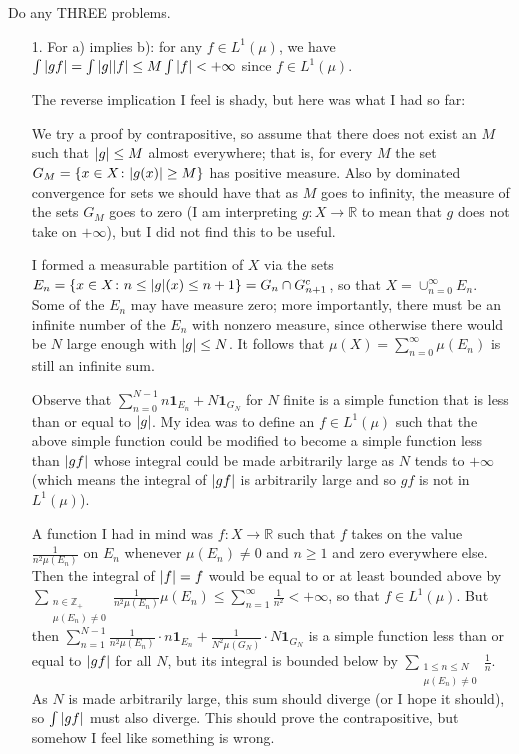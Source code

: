 \documentclass[11pt]{article}
\newcommand{\cbr}[1]{\left\{#1\right\}}
\begin{document}
Do any THREE problems.
\begin{enumerate}
  \item[1.] For a) implies b): for any $f\in L^1(\mu)$, we have $\int\abs{gf} = \int\abs{g}\abs{f}\leq M\int\abs{f}<+\infty$ since $f\in L^1(\mu)$.
  
  The reverse implication I feel is shady, but here was what I had so far: 

  We try a proof by contrapositive, so assume that there does not exist an $M$ such that $\abs{g}\leq M$ almost everywhere; that is, for every $M$ the set $G_M = \cbr{x\in X\colon \abs{g(x)}\geq M}$ has positive measure. Also by dominated convergence for sets we should have that as $M$ goes to infinity, the measure of the sets $G_M$ goes to zero (I am interpreting $g\colon X\to \mathbb{R}$ to mean that $g$ does not take on $+\infty$), but I did not find this to be useful.

  I formed a measurable partition of $X$ via the sets $E_n = \cbr{x\in X\colon n\leq \abs{g}(x)\leq n+1} = G_n\cap G_{n+1}^c$, so that $X = \cup_{n=0}^\infty E_n$. Some of the $E_n$ may have measure zero; more importantly, there must be an infinite number of the $E_n$ with nonzero measure, since otherwise there would be $N$ large enough with $\abs{g}\leq N$. It follows that $\mu(X) = \sum_{n=0}^\infty \mu(E_n)$ is still an infinite sum. 

  Observe that $\sum_{n=0}^{N-1} n\mathbf{1}_{E_n} + N\mathbf{1}_{G_N}$ for $N$ finite is a simple function that is less than or equal to $\abs{g}$. My idea was to define an $f\in L^1(\mu)$ such that the above simple function could be modified to become a simple function less than $\abs{gf}$ whose integral could be made arbitrarily large as $N$ tends to $+\infty$ (which means the integral of $\abs{gf}$ is arbitrarily large and so $gf$ is not in $L^1(\mu)$).
  
  A function I had in mind was $f\colon X\to\mathbb{R}$ such that $f$ takes on the value $\frac{1}{n^2\mu(E_n)}$ on $E_n$ whenever $\mu(E_n)\neq 0$ and $n\geq 1$ and zero everywhere else. Then the integral of $\abs{f} = f$ would be equal to or at least bounded above by $\sum_{\substack{n\in\mathbb{Z}_+\\ \mu(E_n)\neq 0}}\frac{1}{n^2\mu(E_n)}\mu(E_n)\leq \sum_{n=1}^\infty\frac{1}{n^2}<+\infty$, so that $f\in L^1(\mu)$. But then $\sum_{n=1}^{N-1} \frac{1}{n^2\mu(E_n)}\cdot n\mathbf{1}_{E_n} + \frac{1}{N^2\mu(G_N)}\cdot N\mathbf{1}_{G_N}$ is a simple function less than or equal to $\abs{gf}$ for all $N$, but its integral is bounded below by $\sum_{\substack{1\leq n\leq N\\ \mu(E_n)\neq 0}}\frac{1}{n}$. As $N$ is made arbitrarily large, this sum should diverge (or I hope it should), so $\int \abs{gf}$ must also diverge. This should prove the contrapositive, but somehow I feel like something is wrong.


\end{enumerate}
\end{document}

